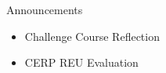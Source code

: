 \begin{frame}{Announcements}
    \begin{itemize}
        \item Challenge Course Reflection
        \item CERP REU Evaluation
    \end{itemize}
\end{frame}
